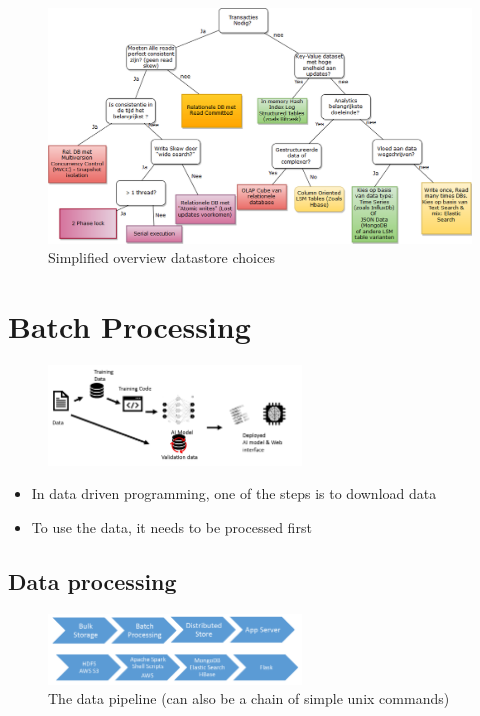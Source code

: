 \documentclass{article}
\begin{document}
\begin{figure}[H]
    \centering
    \includegraphics[width=\textwidth]{overview-datastores.png}
    \caption{Simplified overview datastore choices}
\end{figure}

\section{Batch Processing}

\begin{figure}[H]
    \centering
    \includegraphics[width=0.6\textwidth]{data-driven-programming.png}
\end{figure}

\begin{itemize}
    \item In data driven programming, one of the steps is to download data
    \item To use the data, it needs to be processed first
\end{itemize}

\subsection{Data processing}

\begin{figure}[H]
    \centering
    \includegraphics[width=0.6\textwidth]{data-pipeline.png}
    \caption{The data pipeline (can also be a chain of simple unix commands)}
\end{figure}
\end{document}
